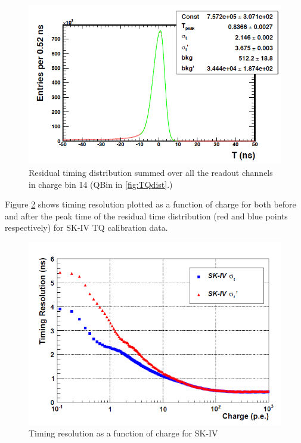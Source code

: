 \begin{figure}
    \includegraphics[width=\textwidth]{Figures/asygausst.png}
\caption{Residual timing distribution summed over all the readout channels in charge bin 14 (QBin in \ref{fig:TQdist}.)}
    \label{fig:asygausst}
\end{figure}



Figure \ref{fig:resolutiont} shows timing resolution  plotted as a function of charge for both before and after the peak time of the residual time distribution (red and blue points respectively) for SK-IV TQ calibration data. 

\begin{figure}
    \includegraphics[width=\textwidth]{Figures/resolutiont.png}
\caption{Timing resolution as a function of charge for SK-IV}
    \label{fig:resolutiont}
\end{figure}


